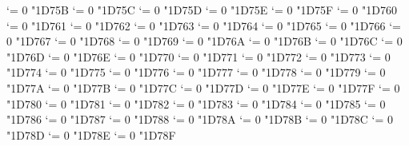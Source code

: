{  \Umathcode `\Ζ = 0 \alphafam "1D75B
  \Umathcode `\Η = 0 \alphafam "1D75C
  \Umathcode `\Θ = 0 \alphafam "1D75D
  \Umathcode `\Ι = 0 \alphafam "1D75E
  \Umathcode `\Κ = 0 \alphafam "1D75F
  \Umathcode `\Λ = 0 \alphafam "1D760
  \Umathcode `\Μ = 0 \alphafam "1D761
  \Umathcode `\Ν = 0 \alphafam "1D762
  \Umathcode `\Ξ = 0 \alphafam "1D763
  \Umathcode `\Ο = 0 \alphafam "1D764
  \Umathcode `\Π = 0 \alphafam "1D765
  \Umathcode `\Ρ = 0 \alphafam "1D766
  \Umathcode `\ϴ = 0 \alphafam "1D767
  \Umathcode `\Σ = 0 \alphafam "1D768
  \Umathcode `\Τ = 0 \alphafam "1D769
  \Umathcode `\Υ = 0 \alphafam "1D76A
  \Umathcode `\Φ = 0 \alphafam "1D76B
  \Umathcode `\Χ = 0 \alphafam "1D76C
  \Umathcode `\Ψ = 0 \alphafam "1D76D
  \Umathcode `\Ω = 0 \alphafam "1D76E
  \Umathcode `\α = 0 \alphafam "1D770
  \Umathcode `\β = 0 \alphafam "1D771
  \Umathcode `\γ = 0 \alphafam "1D772
  \Umathcode `\δ = 0 \alphafam "1D773
  \Umathcode `\ε = 0 \alphafam "1D774
  \Umathcode `\ζ = 0 \alphafam "1D775
  \Umathcode `\η = 0 \alphafam "1D776
  \Umathcode `\θ = 0 \alphafam "1D777
  \Umathcode `\ι = 0 \alphafam "1D778
  \Umathcode `\κ = 0 \alphafam "1D779
  \Umathcode `\λ = 0 \alphafam "1D77A
  \Umathcode `\μ = 0 \alphafam "1D77B
  \Umathcode `\ν = 0 \alphafam "1D77C
  \Umathcode `\ξ = 0 \alphafam "1D77D
  \Umathcode `\ο = 0 \alphafam "1D77E
  \Umathcode `\π = 0 \alphafam "1D77F
  \Umathcode `\ρ = 0 \alphafam "1D780
  \Umathcode `\ς = 0 \alphafam "1D781
  \Umathcode `\σ = 0 \alphafam "1D782
  \Umathcode `\τ = 0 \alphafam "1D783
  \Umathcode `\υ = 0 \alphafam "1D784
  \Umathcode `\ϕ = 0 \alphafam "1D785
  \Umathcode `\χ = 0 \alphafam "1D786
  \Umathcode `\ψ = 0 \alphafam "1D787
  \Umathcode `\ω = 0 \alphafam "1D788
  \Umathcode `\ϵ = 0 \alphafam "1D78A
  \Umathcode `\ϑ = 0 \alphafam "1D78B
  \Umathcode `\ϰ = 0 \alphafam "1D78C
  \Umathcode `\φ = 0 \alphafam "1D78D
  \Umathcode `\ϱ = 0 \alphafam "1D78E
  \Umathcode `\ϖ = 0 \alphafam "1D78F
\fi
\tensfbf}
\let\bfsf=\sfbf

